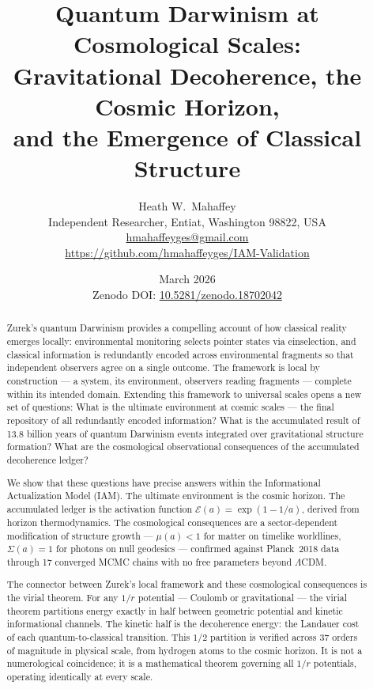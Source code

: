 \documentclass[12pt,a4paper]{article}
\title{\textbf{Quantum Darwinism at Cosmological Scales:\\
Gravitational Decoherence, the Cosmic Horizon,\\
and the Emergence of Classical Structure}}
\author{Heath W.\ Mahaffey\\
\small Independent Researcher, Entiat, Washington 98822, USA\\
\small \href{mailto:hmahaffeyges@gmail.com}{hmahaffeyges@gmail.com}\\
\small \url{https://github.com/hmahaffeyges/IAM-Validation}}
\date{March 2026\\
\small Zenodo DOI: \href{https://doi.org/10.5281/zenodo.18702042}{10.5281/zenodo.18702042}}
\begin{document}
\maketitle

\begin{abstract}
Zurek's quantum Darwinism provides a compelling account of how classical
reality emerges locally: environmental monitoring selects pointer states via
einselection, and classical information is redundantly encoded across
environmental fragments so that independent observers agree on a single
outcome. The framework is local by construction --- a system, its environment,
observers reading fragments --- complete within its intended domain. Extending
this framework to universal scales opens a new set of questions: What is the
ultimate environment at cosmic scales --- the final repository of all
redundantly encoded information? What is the accumulated result of 13.8
billion years of quantum Darwinism events integrated over gravitational
structure formation? What are the cosmological observational consequences
of the accumulated decoherence ledger?

We show that these questions have precise answers within the Informational
Actualization Model (IAM). The ultimate environment is the cosmic horizon.
The accumulated ledger is the activation function $\mathcal{E}(a) =
\exp(1 - 1/a)$, derived from horizon thermodynamics. The cosmological
consequences are a sector-dependent modification of structure growth ---
$\mu(a) < 1$ for matter on timelike worldlines, $\Sigma(a) = 1$ for photons
on null geodesics --- confirmed against Planck~2018 data through 17 converged
MCMC chains with no free parameters beyond $\Lambda$CDM.

The connector between Zurek's local framework and these cosmological
consequences is the virial theorem. For any $1/r$ potential --- Coulomb or
gravitational --- the virial theorem partitions energy exactly in half between
geometric potential and kinetic informational channels. The kinetic half is
the decoherence energy: the Landauer cost of each quantum-to-classical
transition. This $1/2$ partition is verified across 37 orders of magnitude in
physical scale, from hydrogen atoms to the cosmic horizon. It is not a
numerological coincidence; it is a mathematical theorem governing all $1/r$
potentials, operating identically at every scale.


\end{abstract}
\end{document}
